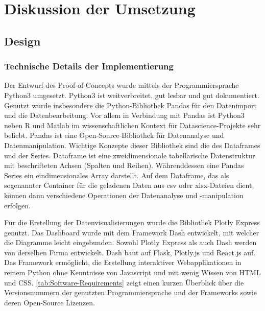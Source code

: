 \chapter{Diskussion der Umsetzung}
\label{chap:five}
\section{Design}
    \subsection{Technische Details der Implementierung}
    Der Entwurf des Proof-of-Concepts wurde mittels der Programmiersprache Python3 umgesetzt. 
    Python3 ist weitverbreitet, gut lesbar und gut dokumentiert. Genutzt wurde insbesondere die Python-Bibliothek 
    Pandas für den Datenimport und die Datenbearbeitung. Vor allem in Verbindung mit Pandas ist Python3 neben R und Matlab
    im wissenschaftlichen Kontext für Datascience-Projekte sehr beliebt. Pandas ist eine Open-Source-Bibliothek 
    für Datenanalyse und Datenmanipulation. Wichtige Konzepte dieser Bibliothek sind die des Dataframes und der Series. 
    Dataframe ist eine zweidimensionale tabellarische Datenstruktur mit beschrifteten Achsen (Spalten und Reihen).
    Währenddessen eine Pandas Series ein eindimensionales Array darstellt. Auf dem Dataframe, das als sogenannter Container für
    die geladenen Daten aus csv oder xlsx-Dateien dient, können dann verschiedene Operationen der Datenanalyse und -manipulation erfolgen.

    
    Für die Erstellung der Datenvisualisierungen wurde die Bibliothek Plotly Express genutzt. 
    Das Dashboard wurde mit dem Framework Dash entwickelt, mit welcher die Diagramme leicht eingebunden. 
    Sowohl Plotly Express als auch Dash werden von derselben Firma entwickelt. Dash baut
    auf Flask, Plotly.js und React.js auf. Das Framework ermöglicht, die Erstellung interaktiver Webapplikationen 
    in reinem Python ohne Kenntnisse von Javascript und mit wenig Wissen von HTML und CSS. \autoref{tab:Software-Requirements} zeigt einen 
    kurzen Überblick über die Versionsnummern der genutzten Programmiersprache und der Frameworks sowie deren Open-Source
    Lizenzen.
    
